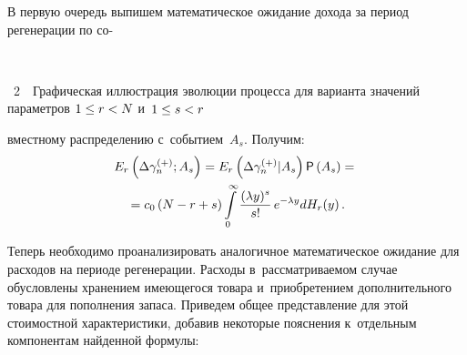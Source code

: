 \begin{multicols}{2}
  
  В первую очередь выпишем математическое ожидание дохода за период 
регенерации по со-\linebreak\vspace*{-12pt}

{ \begin{center}  %
 \vspace*{9pt}
   \mbox{%
 \epsfxsize=50.08mm 
 }


\end{center}

\vspace*{-1pt}


\noindent
{{\figurename~2}\ \ \small{Графическая иллюстрация эволюции процесса для варианта значений 
па\-ра\-мет\-ров $1\hm\leq r\hm<N$ и~$1\hm\leq s\hm<r$}}

}


\noindent
вместному распределению с~событием~$A_s$. Получим:
  \begin{multline}
  E_r\left(\Delta \gamma_n^{(+)};A_s\right) =E_r\left( \Delta 
\gamma_n^{(+)}\vert A_s\right) {\sf P}\left( A_s\right) ={}\\
  {}=c_0 \left( N-r+s\right) \int\limits_0^\infty \displaystyle\frac{\displaystyle (\lambda y)^s\mathstrut}{\displaystyle s!\mathstrut}\,e^{-\lambda 
y} dH_r(y)\,.
  \label{e8-sn}
  \end{multline}
  
  Теперь необходимо проанализировать аналогичное математическое 
ожидание для расходов на периоде регенерации. Расходы в~рас\-смат\-ри\-ва\-емом 
случае обуслов\-ле\-ны хранением имеющегося товара и~приобретением 
дополнительного товара для пополнения запаса. Приведем общее 
пред\-став\-ле\-ние для этой стоимостной характеристики, добавив некоторые 
по\-яс\-не\-ния к~отдельным компонентам найденной формулы:


\end{multicols}
